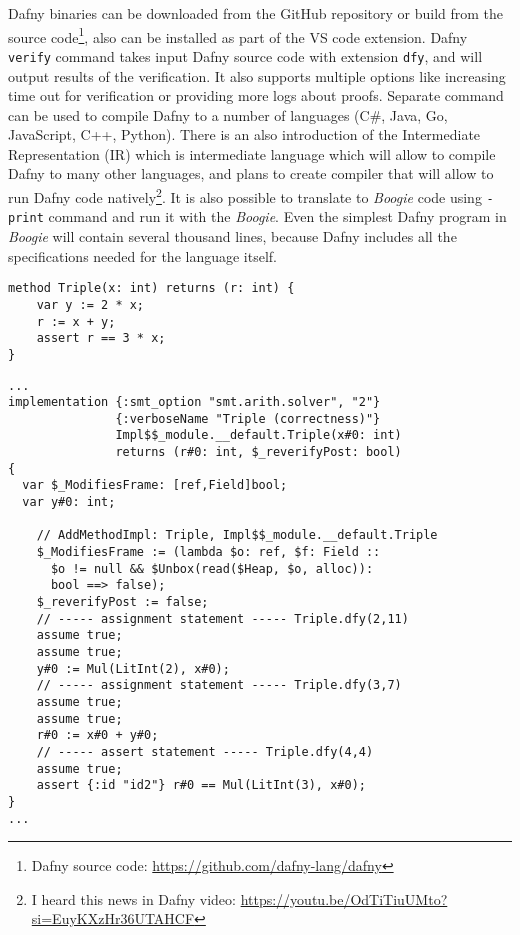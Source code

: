 Dafny binaries can be downloaded from the GitHub repository or build from the source code\footnote{Dafny source code: \url{https://github.com/dafny-lang/dafny}}, also can be installed as part of the VS code extension. Dafny \texttt{verify} command takes input Dafny source code with extension \texttt{dfy}, and will output results of the verification. It also supports multiple options like increasing time out for verification or providing more logs about proofs. Separate command can be used to compile Dafny to a number of languages (C\#, Java, Go, JavaScript, C++, Python). There is an also introduction of the Intermediate Representation (IR) which is intermediate language which will allow to compile Dafny to many other languages, and plans to create compiler that will allow to run Dafny code natively\footnote{I heard this news in Dafny video: \url{https://youtu.be/OdTiTiuUMto?si=EuyKXzHr36UTAHCF}}.
It is also possible to translate to \textit{Boogie} code using \texttt{-print} command and run it with the \textit{Boogie}. Even the simplest Dafny program in \textit{Boogie} will contain several thousand lines, because Dafny includes all the specifications needed for the language itself.

\begin{lstlisting}[language=Dafny,caption={Dafny Triple method},label={lst:triple}]
method Triple(x: int) returns (r: int) {
    var y := 2 * x;
    r := x + y;
    assert r == 3 * x;
}
\end{lstlisting}

\begin{lstlisting}[language=Dafny,caption={Boogie Triple method, part of the code translated from Dafny to Boogie},label={lst:boogietriple}]
...
implementation {:smt_option "smt.arith.solver", "2"}
               {:verboseName "Triple (correctness)"}
               Impl$$_module.__default.Triple(x#0: int)
               returns (r#0: int, $_reverifyPost: bool)
{
  var $_ModifiesFrame: [ref,Field]bool;
  var y#0: int;

    // AddMethodImpl: Triple, Impl$$_module.__default.Triple
    $_ModifiesFrame := (lambda $o: ref, $f: Field :: 
      $o != null && $Unbox(read($Heap, $o, alloc)): 
      bool ==> false);
    $_reverifyPost := false;
    // ----- assignment statement ----- Triple.dfy(2,11)
    assume true;
    assume true;
    y#0 := Mul(LitInt(2), x#0);
    // ----- assignment statement ----- Triple.dfy(3,7)
    assume true;
    assume true;
    r#0 := x#0 + y#0;
    // ----- assert statement ----- Triple.dfy(4,4)
    assume true;
    assert {:id "id2"} r#0 == Mul(LitInt(3), x#0);
}
...
\end{lstlisting}

